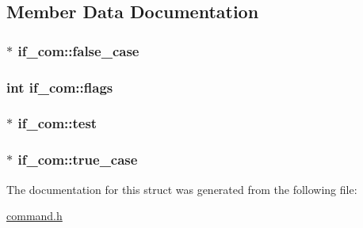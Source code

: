 \subsection{Member Data Documentation}
\subsubsection[{\texorpdfstring{false\+\_\+case}{false_case}}]{$\ast$ if\+\_\+com\+::false\+\_\+case}\hypertarget{structif__com_ac9f1b317a7c8ff4c750335c571c33a15}{}\label{structif__com_ac9f1b317a7c8ff4c750335c571c33a15}
\subsubsection[{\texorpdfstring{flags}{flags}}]{\setlength{\rightskip}{0pt plus 5cm}int if\+\_\+com\+::flags}\hypertarget{structif__com_a07d76d76b991c3dbabbf5b5c0e123836}{}\label{structif__com_a07d76d76b991c3dbabbf5b5c0e123836}
\subsubsection[{\texorpdfstring{test}{test}}]{$\ast$ if\+\_\+com\+::test}\hypertarget{structif__com_a28a2dd8a917262a9eaa0c446d1b54fe0}{}\label{structif__com_a28a2dd8a917262a9eaa0c446d1b54fe0}
\subsubsection[{\texorpdfstring{true\+\_\+case}{true_case}}]{$\ast$ if\+\_\+com\+::true\+\_\+case}\hypertarget{structif__com_ae691d759258b18e45dd18591e71dc141}{}\label{structif__com_ae691d759258b18e45dd18591e71dc141}


The documentation for this struct was generated from the following file\+:\begin{DoxyCompactItemize}
\item 
\hyperlink{command_8h}{command.\+h}\end{DoxyCompactItemize}
